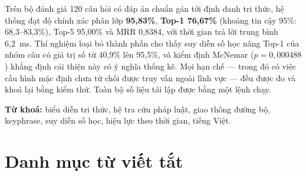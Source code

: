 Trên bộ đánh giá 120 câu hỏi có đáp án chuẩn gán tới định danh tri thức, hệ thống đạt độ
chính xác phân lớp \textbf{95,83\%}, \textbf{Top-1 76,67\%} (khoảng tin cậy 95\%:
68,3--83,3\%), Top-5 95,00\% và MRR 0,8384, với thời gian trả lời trung bình 6,2~ms. Thí
nghiệm loại bỏ thành phần cho thấy suy diễn số học nâng Top-1 của nhóm câu có giá trị số
từ 40,9\% lên 95,5\%, và kiểm định McNemar ($p = 0{,}000488$) khẳng định cải thiện này có ý
nghĩa thống kê. Mọi hạn chế --- trong đó có việc cấu hình mặc định chưa từ chối được truy
vấn ngoài lĩnh vực --- đều được đo và khoá lại bằng kiểm thử. Toàn bộ số liệu tái lập được
bằng một lệnh chạy.

\vspace{0.6em}
\noindent\textbf{Từ khoá:} biểu diễn tri thức, hệ tra cứu pháp luật, giao thông đường bộ,
keyphrase, suy diễn số học, hiệu lực theo thời gian, tiếng Việt.

\clearpage
{
\tableofcontents
\clearpage
\listoffigures
{}
\vspace{1.2em}
\listoftables
{}
}

\clearpage
\section*{Danh mục từ viết tắt}

